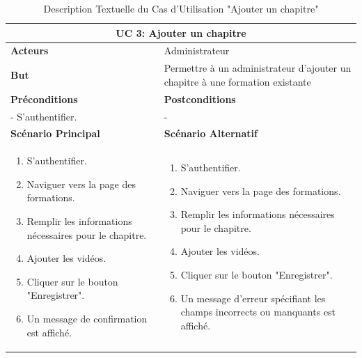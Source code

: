 \newpage

\begin{minipage}{\textwidth}
\begin{table}[H]
\centering
\begin{tabular}{| m{8cm} | m{8cm} |}
\hline
\multicolumn{2}{|c|}{\textbf{UC 3:} Ajouter un chapitre} \\ \hline
\textbf{Acteurs} & Administrateur \\ \hline
\textbf{But} & Permettre à un administrateur d'ajouter un chapitre à une formation existante \\ \hline
\textbf{Préconditions} & \textbf{Postconditions} \\ \hline
- S'authentifier. & - \\ \hline
\textbf{Scénario Principal} & \textbf{Scénario Alternatif} \\ \hline
\begin{enumerate}
    \item S'authentifier.
    \item Naviguer vers la page des formations.
    \item Remplir les informations nécessaires pour le chapitre.
    \item Ajouter les vidéos.
    \item Cliquer sur le bouton "Enregistrer".
    \item Un message de confirmation est affiché.
\end{enumerate} & 
\begin{enumerate}
    \item S'authentifier.
    \item Naviguer vers la page des formations.
    \item Remplir les informations nécessaires pour le chapitre.
    \item Ajouter les vidéos.
    \item Cliquer sur le bouton "Enregistrer".
    \item Un message d'erreur spécifiant les champs incorrects ou manquants est affiché.
\end{enumerate} \\ \hline
\end{tabular}
\caption{Description Textuelle du Cas d'Utilisation "Ajouter un chapitre"}
\label{tab:use_case_description_3}
\end{table}
\end{minipage}

\newpage

